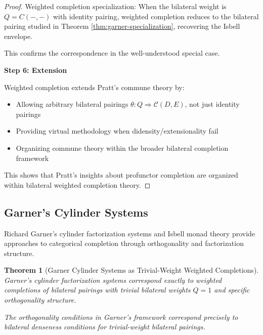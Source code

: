 \documentclass[11pt]{article}
\theoremstyle{plain}
\newtheorem{theorem}{Theorem}[section]
\theoremstyle{definition}
\theoremstyle{remark}
\begin{document}
\begin{proof}
Weighted completion specialization: When the bilateral weight is $Q = C(-, -)$ with identity pairing, weighted completion reduces to the bilateral pairing studied in Theorem \ref{thm:garner-specialization}, recovering the Isbell envelope.

This confirms the correspondence in the well-understood special case.

\textbf{Step 6: Extension}

Weighted completion extends Pratt's commune theory by:
\begin{itemize}
\item Allowing arbitrary bilateral pairings $\theta : Q \Rightarrow \mathcal{C}(D, E)$, not just identity pairings
\item Providing virtual methodology when didensity/extensionality fail
\item Organizing commune theory within the broader bilateral completion framework
\end{itemize}

This shows that Pratt's insights about profunctor completion are organized within bilateral weighted completion theory.
\end{proof}

\subsection{Garner's Cylinder Systems}

Richard Garner's cylinder factorization systems \cite{garner2018cylinder} and Isbell monad theory provide approaches to categorical completion through orthogonality and factorization structure.

\begin{theorem}[Garner Cylinder Systems as Trivial-Weight Weighted Completions]\label{thm:garner-cylinder-correspondence}
Garner's cylinder factorization systems correspond exactly to weighted completions of bilateral pairings with trivial bilateral weights $Q = 1$ and specific orthogonality structure.

The orthogonality conditions in Garner's framework correspond precisely to bilateral denseness conditions for trivial-weight bilateral pairings.
\end{theorem}
\end{document}
